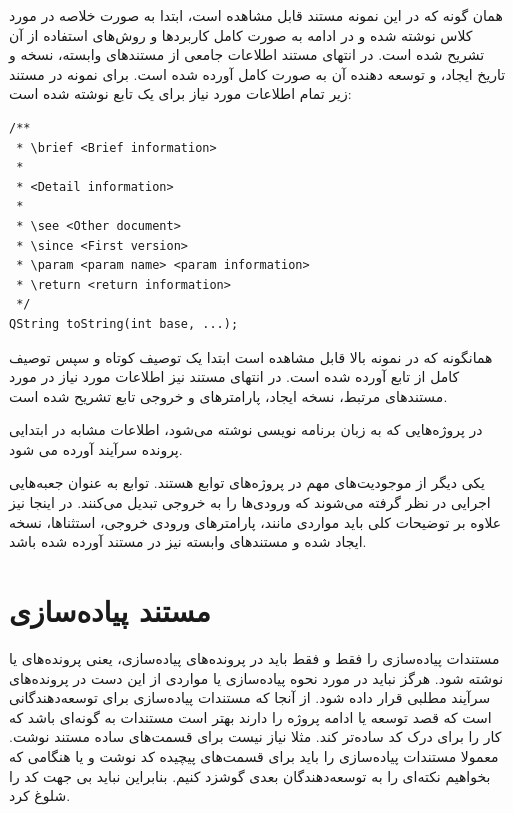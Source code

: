 همان گونه که در این نمونه مستند قابل مشاهده است، ابتدا به صورت خلاصه در مورد
کلاس نوشته شده و در ادامه به صورت کامل کاربردها و روش‌های استفاده از آن تشریح
شده است. در انتهای مستند اطلاعات جامعی از مستند‌های وابسته، نسخه و
تاریخ ایجاد، و توسعه دهنده آن به صورت کامل آورده شده است. برای نمونه در مستند
زیر تمام اطلاعات مورد نیاز برای یک تابع نوشته شده است:

\begin{latin}
\lstset{language=C++}  
\begin{lstlisting}[frame=single] 
/**
 * \brief <Brief information>
 * 
 * <Detail information>
 * 
 * \see <Other document>
 * \since <First version>
 * \param <param name> <param information>
 * \return <return information>
 */
QString toString(int base, ...);
\end{lstlisting}
\end{latin}

همانگونه که در نمونه بالا قابل مشاهده است ابتدا یک توصیف کوتاه و سپس توصیف کامل
از تابع آورده شده است. در انتهای مستند نیز اطلاعات مورد نیاز در مورد مستندهای
مرتبط، نسخه ایجاد، پارامترهای و خروجی تابع تشریح شده است.

\begin{note}
در پروژه‌هایی که به زبان برنامه نویسی  نوشته می‌شود، اطلاعات مشابه در
ابتدایی پرونده سرآیند آورده می شود.
\end{note}

یکی دیگر از موجودیت‌های مهم در پروژه‌های  توابع هستند. توابع به عنوان
جعبه‌هایی اجرایی در نظر گرفته می‌شوند که ورودی‌ها را به خروجی تبدیل می‌کنند. در
اینجا نیز علاوه بر توضیحات کلی باید مواردی مانند، پارامترهای ورودی خروجی،
استثناها، نسخه‌ ایجاد شده و مستندهای وابسته نیز در مستند آورده شده باشد.


\section{مستند پیاده‌سازی}

مستندات پیاده‌سازی را فقط و فقط باید در پرونده‌های پیاده‌سازی، یعنی پرونده‌های
 یا  نوشته شود. هرگز نباید در مورد نحوه پیاده‌سازی یا مواردی از
این دست در پرونده‌های سرآیند مطلبی قرار داده شود.
از آنجا که مستندات پیاده‌سازی برای توسعه‌دهندگانی است که قصد توسعه یا ادامه
پروژه را دارند بهتر است مستندات به گونه‌ای باشد که کار را برای درک کد ساده‌تر
کند. مثلا نیاز نیست برای قسمت‌های ساده مستند نوشت.
معمولا مستندات پیاده‌سازی را باید برای قسمت‌های پیچیده کد نوشت و یا هنگامی که
بخواهیم نکته‌ای را به توسعه‌دهندگان بعدی گوشزد کنیم. بنابراین نباید بی جهت کد را
شلوغ کرد.

